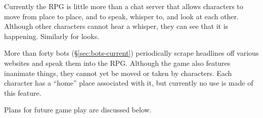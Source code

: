Currently the RPG is little more than a chat server that allows characters to
move from place to place, and to speak, whisper to, and look at each other.
Although other characters cannot hear a whisper, they can see that it is
happening.
Similarly for looks.

More than forty bots (\S\ref{sec:bots-current}) periodically
scrape headlines off various websites and speak them into the RPG\@.
Although the game also features inanimate things, they cannot yet be moved
or taken by characters.
Each character has a ``home'' place associated with it, but currently no use is
made of this feature.

Plans for future game play are discussed below.